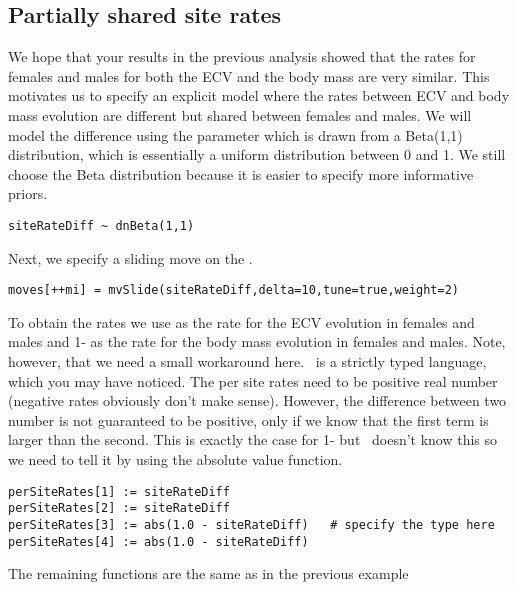 \subsection{Partially shared site rates}
We hope that your results in the previous analysis showed that the rates for females and males for both the ECV and the body mass are very similar.
This motivates us to specify an explicit model where the rates between ECV and body mass evolution are different but shared between females and males.
We will model the difference using the  parameter which is drawn from a Beta(1,1) distribution, which is essentially a uniform distribution between 0 and 1.
We still choose the Beta distribution because it is easier to specify more informative priors.
{\tt \small \begin{snugshade*}
\begin{lstlisting}
siteRateDiff ~ dnBeta(1,1)
\end{lstlisting}
\end{snugshade*}}
Next, we specify a sliding move on the .
{\tt \small \begin{snugshade*}
\begin{lstlisting}
moves[++mi] = mvSlide(siteRateDiff,delta=10,tune=true,weight=2)
\end{lstlisting}
\end{snugshade*}}
To obtain the rates we use  as the rate for the ECV evolution in females and males and 1- as the rate for the body mass evolution in females and males.
Note, however, that we need a small workaround here. \Rev~is a strictly typed language, which you may have noticed. The per site rates need to be positive real number (negative rates obviously don't make sense). However, the difference between two number is not guaranteed to be positive, only if we know that the first term is larger than the second. This is exactly the case for 1- but \RevBayes~doesn't know this so we need to tell it by using the absolute value  function.
{\tt \small \begin{snugshade*}
\begin{lstlisting}
perSiteRates[1] := siteRateDiff
perSiteRates[2] := siteRateDiff
perSiteRates[3] := abs(1.0 - siteRateDiff)   # specify the type here
perSiteRates[4] := abs(1.0 - siteRateDiff)
\end{lstlisting}
\end{snugshade*}}
The remaining functions are the same as in the previous example




